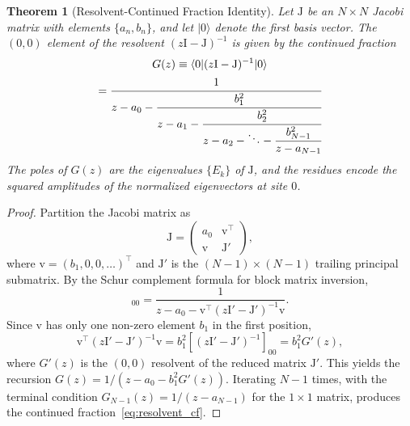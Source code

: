 \documentclass[reprint, floatfix, superscriptaddress, amsmath, amssymb, longbibliography]{revtex4-2}
\newtheorem{theorem}{Theorem}[section]
\begin{document}
\begin{theorem}[Resolvent-Continued Fraction Identity]
\label{thm:resolvent_cf}
Let $\mathrm{J}$ be an $N \times N$ Jacobi matrix with elements $\{a_n, b_n\}$, and let $|0\rangle$ denote the first basis vector. The $(0,0)$ element of the resolvent $(z\mathrm{I} - \mathrm{J})^{-1}$ is given by the continued fraction
\begin{multline}
G(z) \equiv 
\langle 0 | (z\mathrm{I} - \mathrm{J})^{-1} | 0 \rangle \\
= \cfrac{1}{z - a_0
 - \cfrac{b_1^2}{z - a_1
 - \cfrac{b_2^2}{z - a_2
 - \ddots
 - \cfrac{b_{N-1}^2}{z - a_{N-1}}}}}
\label{eq:resolvent_cf}
\end{multline}
The poles of $G(z)$ are the eigenvalues $\{E_k\}$ of $\mathrm{J}$, and the residues encode the squared amplitudes of the normalized eigenvectors at site $0$.
\end{theorem}

\begin{proof}
Partition the Jacobi matrix as
\begin{equation}
\mathrm{J} = \begin{pmatrix}
a_0 & \mathrm{v}^\top \\
\mathrm{v} & \mathrm{J}'
\end{pmatrix},
\end{equation}
where $\mathrm{v} = (b_1, 0, 0, \ldots)^\top$ and $\mathrm{J}'$ is the $(N-1) \times (N-1)$ trailing principal submatrix. By the Schur complement formula for block matrix inversion,
\begin{equation}
[(z\mathrm{I} - \mathrm{J})^{-1}]_{00} = \frac{1}{z - a_0 - \mathrm{v}^\top (z\mathrm{I}' - \mathrm{J}')^{-1} \mathrm{v}}.
\end{equation}
Since $\mathrm{v}$ has only one non-zero element $b_1$ in the first position,
\begin{equation}
\mathrm{v}^\top (z\mathrm{I}' - \mathrm{J}')^{-1} \mathrm{v} = b_1^2 [(z\mathrm{I}' - \mathrm{J}')^{-1}]_{00} = b_1^2 G'(z),
\end{equation}
where $G'(z)$ is the $(0,0)$ resolvent of the reduced matrix $\mathrm{J}'$. This yields the recursion $G(z) = 1/(z - a_0 - b_1^2 G'(z))$. Iterating $N-1$ times, with the terminal condition $G_{N-1}(z) = 1/(z - a_{N-1})$ for the $1 \times 1$ matrix, produces the continued fraction~\eqref{eq:resolvent_cf}.
\end{proof}
\end{document}
